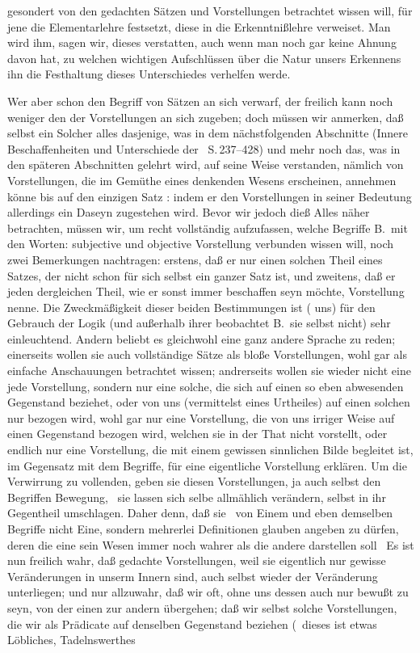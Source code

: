 gesondert von den gedachten Sätzen und Vorstellungen betrachtet wissen will, für jene die Elementarlehre festsetzt, diese in die Erkenntnißlehre verweiset. Man wird ihm, sagen wir, dieses verstatten, auch wenn man noch gar keine Ahnung davon hat, zu welchen wichtigen Aufschlüssen über die Natur unsers Erkennens ihn die Festhaltung dieses Unterschiedes verhelfen werde. \par
Wer aber schon den Begriff von Sätzen an sich verwarf, der freilich kann noch weniger den der Vorstellungen an sich zugeben; doch müssen wir anmerken, daß selbst ein Solcher alles dasjenige, was in dem nächstfolgenden Abschnitte (\glqq Innere Beschaffenheiten und Unterschiede der \ S.\,237--428) und mehr noch das, was in den späteren Abschnitten gelehrt wird, auf seine Weise verstanden, nämlich von Vorstellungen, die im Gemüthe eines  denkenden Wesens erscheinen, annehmen könne bis auf den einzigen Satz :  indem er den Vorstellungen in seiner Bedeutung allerdings ein Daseyn zugestehen wird. Bevor wir jedoch dieß Alles näher betrachten, müssen wir, um recht vollständig aufzufassen, welche Begriffe B.\ mit den Worten: subjective und objective Vorstellung verbunden wissen will, noch zwei Bemerkungen nachtragen: erstens, daß er nur einen solchen Theil eines Satzes, der nicht schon für sich selbst ein ganzer Satz ist, und zweitens, daß er jeden dergleichen Theil, wie er sonst immer beschaffen seyn möchte, Vorstellung nenne. Die Zweckmäßigkeit dieser beiden Bestimmungen ist ( uns) für den Gebrauch der Logik (und außerhalb ihrer beobachtet B.\ sie selbst nicht) sehr einleuchtend. Andern beliebt es gleichwohl eine ganz andere Sprache zu reden; einerseits wollen sie auch vollständige Sätze als bloße Vorstellungen, wohl gar als einfache Anschauungen betrachtet wissen; andrerseits wollen sie wieder nicht eine jede Vorstellung, sondern nur eine solche, die sich auf einen so eben abwesenden Gegenstand beziehet, oder von uns (vermittelst eines Urtheiles) auf einen solchen nur bezogen wird, wohl gar nur eine Vorstellung, die von uns irriger Weise auf einen Gegenstand bezogen wird, welchen sie in der That nicht vorstellt, oder endlich nur eine Vorstellung, die mit einem gewissen sinnlichen Bilde begleitet ist, im Gegensatz mit dem Begriffe, für eine eigentliche Vorstellung erklären. Um die Verwirrung zu vollenden, geben sie diesen Vorstellungen, ja auch selbst den Begriffen Bewegung, \dh\  sie lassen sich selbe allmählich verändern, selbst in ihr Gegentheil umschlagen. Daher denn, daß sie \zB\ von Einem und eben demselben Begriffe nicht Eine, sondern mehrerlei Definitionen glauben angeben zu dürfen, deren die eine sein Wesen immer noch wahrer als die andere darstellen soll \usw\ Es ist nun freilich wahr, daß gedachte Vorstellungen, weil sie eigentlich nur gewisse Veränderungen in unserm Innern sind, auch selbst wieder der Veränderung unterliegen; und nur allzuwahr, daß wir oft, ohne uns dessen auch nur bewußt zu seyn, von der einen zur andern übergehen; daß wir selbst solche Vorstellungen, die wir als Prädicate auf denselben Gegenstand beziehen (\zB\ dieses ist etwas Löbliches, Tadelnswerthes 